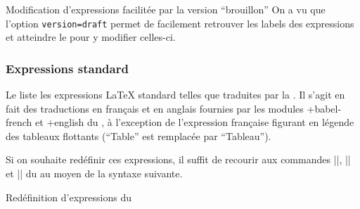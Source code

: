 \begin{dbremark}{Modification d'expressions facilitée par la version
    \enquote{brouillon}}{}
  On a vu  que l'option
  \lstinline[deletekeywords={version}]|version=draft| permet de facilement
  retrouver les labels des expressions et atteindre le \File{\configurationfile}
  pour y modifier celles-ci.
\end{dbremark}

\subsubsection{Expressions standard}
\label{sec-expressions-standard}%
%

Le  liste les expressions \LaTeX{} standard
telles que traduites par la \yatCl{}. Il s'agit en fait des traductions en
français et en anglais fournies par les modules \package*+{babel-french} et
\package*+{english} du , à l'exception de l'expression française
figurant en légende des tableaux flottants (\enquote{Table} est remplacée par
\enquote{Tableau}).%
%

Si on souhaite redéfinir ces expressions, il suffit de recourir aux commandes
|\addto|, |\captionsfrench| et |\captionsenglish| du  au moyen
de la syntaxe suivante.

\begin{preamblecode}[title=Par exemple dans le \File{\configurationfile}]
\addto{}
\addto{}
\end{preamblecode}
\begin{table}[hb]
  \centering
  \caption{Valeurs et commandes d'expressions \LaTeX{} standard fournies par la \yatCl{}}
  \label{tab-expressions-standard}
  
\end{table}
%
\begin{dbexample}{Redéfinition d'expressions du }{}
\begin{preamblecode}[title=Redéfinition des expressions pour les résumés]
\addto{}
\addto{}
\end{preamblecode}
\end{dbexample}

